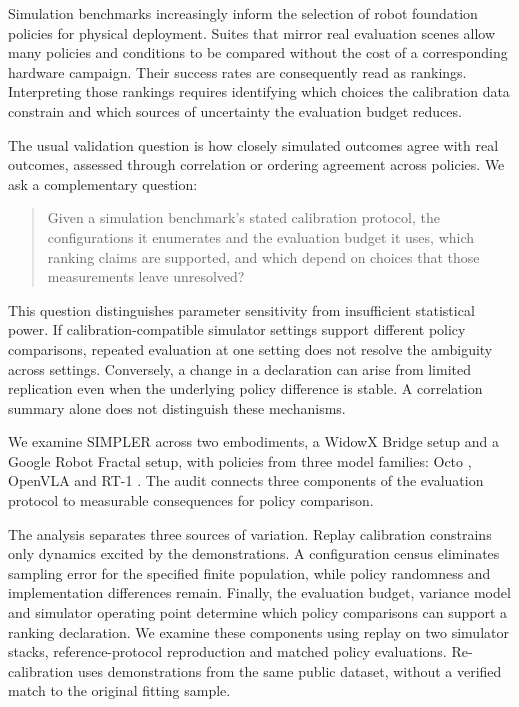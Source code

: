 \documentclass[pdflatex,iicol,sn-apa]{sn-jnl}
\theoremstyle{remark}
\begin{document}
Simulation benchmarks increasingly inform the selection of robot foundation policies for physical
deployment. Suites that mirror real evaluation scenes \citep{li2024simpler} allow many policies and
conditions to be compared without the cost of a corresponding hardware campaign. Their success
rates are consequently read as rankings. Interpreting those rankings requires identifying which
choices the calibration data constrain and which sources of uncertainty the evaluation budget reduces.

The usual validation question is how closely simulated outcomes agree with real outcomes, assessed
through correlation or ordering agreement across policies. We ask a complementary question:
\begin{quote}
Given a simulation benchmark's stated calibration protocol, the configurations it enumerates and
the evaluation budget it uses, which ranking claims are supported, and which depend on choices
that those measurements leave unresolved?
\end{quote}

This question distinguishes parameter sensitivity from insufficient statistical power. If
calibration-compatible simulator settings support different policy comparisons, repeated evaluation
at one setting does not resolve the ambiguity across settings. Conversely, a change in a declaration
can arise from limited replication even when the underlying policy difference is stable. A
correlation summary alone does not distinguish these mechanisms.

We examine SIMPLER across two embodiments, a WidowX Bridge setup and a Google Robot Fractal setup,
with policies from three model families: Octo \citep{octo2024}, OpenVLA
\citep{kim2024openvla} and RT-1 \citep{brohan2023rt1}. The audit connects three components of the
evaluation protocol to measurable consequences for policy comparison.

The analysis separates three sources of variation. Replay calibration constrains only dynamics
excited by the demonstrations. A configuration census eliminates sampling error for the specified
finite population, while policy randomness and implementation differences remain. Finally, the
evaluation budget, variance model and simulator operating point determine which policy comparisons
can support a ranking declaration. We examine these components using replay on two simulator
stacks, reference-protocol reproduction and matched policy evaluations. Re-calibration uses
demonstrations from the same public dataset, without a verified match to the original fitting sample.
\end{document}
